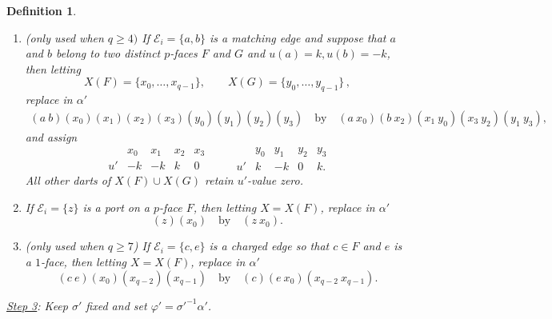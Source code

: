 \documentclass[11pt]{article}
\newtheorem{definition}[theorem]{Definition}
\theoremstyle{remark}
\newcommand{\cE}{\mathcal E}
\begin{document}
\begin{definition}
\begin{enumerate}
\item[(H1b)] (only used when $q\geq 4)$ If $\cE_i=\{a,b\}$ is a matching edge and suppose
that $a$ and $b$ belong to two distinct $p$-faces $F$ and $G$ and $u(a)=k, u(b)=-k$, then letting
\[
 X(F)=\{x_0,\ldots,x_{q-1}\},\qquad
 X(G)=\{y_0,\ldots,y_{q-1}\} \, ,
\]
replace in $\alpha'$
\[
\begin{aligned}
 (a\ b)(x_0)(x_1)(x_2)(x_3)
       (y_0)(y_1)(y_2)(y_3)
 \quad\text{by}\quad
 (a\ x_0)(b\ x_2)(x_1\ y_0)(x_3\ y_2)(y_1\ y_3),
\end{aligned}
\]
and assign
\[
\begin{array}{c|rrrr}
 &x_0&x_1&x_2&x_3\\ \hline
 u'&-k&-k&k&0
\end{array}
\qquad
\begin{array}{c|rrrr}
 &y_0&y_1&y_2&y_3\\ \hline
 u'&k&-k&0&k.
\end{array}
\]
All other darts of $X(F)\cup X(G)$ retain $u'$-value zero.

\item[(H2)] If $\cE_i=\{z\}$ is a port on a $p$-face $F$, then letting $X=X(F)$, replace in $\alpha'$
\[
        (z)(x_0)\quad\text{by}\quad(z\ x_0).
\]

\item[(H3)] (only used when $q\geq 7$) If $\cE_i=\{c,e\}$ is a charged edge so that $c\in F$ and $e$ is a $1$-face, then letting $X=X(F)$, replace in $\alpha'$
\[
 (c\ e)(x_0)(x_{q-2})(x_{q-1})
 \quad\text{by}\quad
 (c)(e\ x_0)(x_{q-2}\ x_{q-1}).
\]

\end{enumerate}

\noindent \underline{Step 3}: Keep $\sigma'$ fixed and set $\varphi'=\sigma'^{-1}\alpha'$. 
\end{definition}
\medskip 

\end{document}
